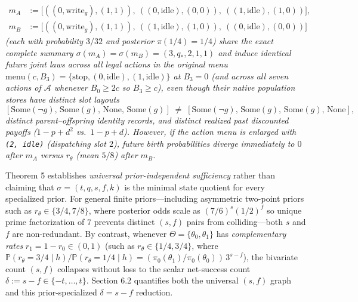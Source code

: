 \documentclass[11pt,letterpaper]{article}
\begin{document}
\begin{enumerate}
\[\begin{aligned}
  m_A &:= \bigl[((0,\mathrm{write}_g),(1,1)),\ ((0,\mathrm{idle}),(0,0)),\ ((1,\mathrm{idle}),(1,0))\bigr], \\
  m_B &:= \bigl[((0,\mathrm{write}_g),(1,1)),\ ((1,\mathrm{idle}),(1,0)),\ ((0,\mathrm{idle}),(0,0))\bigr]
  \end{aligned}\] \emph{(each with probability \(3/32\) and posterior
  \(\pi(1/4) = 1/4\)) share the exact complete summary
  \(\sigma(m_A) = \sigma(m_B) = (3, q_*, 2, 1, 1)\) and induce identical
  future joint laws across all legal actions in the original menu
  \(\mathrm{menu}(c, B_3) = \{\mathrm{stop}, (0, \mathrm{idle}), (1, \mathrm{idle})\}\)
  at \(B_3 = 0\) (and across all seven actions of \(\mathcal{A}\)
  whenever \(B_0 \ge 2c\) so \(B_3 \ge c\)), even though their native
  population stores have distinct slot layouts}
  \[[\mathrm{Some}(\neg g),\, \mathrm{Some}(g),\, \mathrm{None},\, \mathrm{Some}(g)]
  \;\neq\;
  [\mathrm{Some}(\neg g),\, \mathrm{Some}(g),\, \mathrm{Some}(g),\, \mathrm{None}],\]
  \emph{distinct parent--offspring identity records, and distinct
  realized past discounted payoffs (\(1 - p + d^2\) vs.~\(1 - p + d\)).
  However, if the action menu is enlarged with \texttt{(2,\ idle)}
  (dispatching slot \(2\)), future birth probabilities diverge
  immediately to \(0\) after \(m_A\) versus \(r_\theta\) (mean \(5/8\))
  after \(m_B\).}
\end{enumerate}

Theorem 5 establishes \emph{universal prior-independent sufficiency}
rather than claiming that \(\sigma = (t, q, s, f, k)\) is the minimal
state quotient for every specialized prior. For general finite
priors---including asymmetric two-point priors such as
\(r_\theta \in \{3/4, 7/8\}\), where posterior odds scale as
\((7/6)^s (1/2)^f\) so unique prime factorization of \(7\) prevents
distinct \((s,f)\) pairs from colliding---both \(s\) and \(f\) are
non-redundant. By contrast, whenever \(\Theta = \{\theta_0, \theta_1\}\)
has \emph{complementary rates} \(r_1 = 1 - r_0 \in (0,1)\) (such as
\(r_\theta \in \{1/4, 3/4\}\), where
\(\mathbb{P}(r_\theta = 3/4 \mid h)/\mathbb{P}(r_\theta = 1/4 \mid h) = (\pi_0(\theta_1)/\pi_0(\theta_0))\,3^{s - f}\)),
the bivariate count \((s,f)\) collapses without loss to the scalar
net-success count \(\delta := s - f \in \{-t, \dots, t\}\). Section 6.2
quantifies both the universal \((s,f)\) graph and this prior-specialized
\(\delta = s - f\) reduction.
\end{document}

